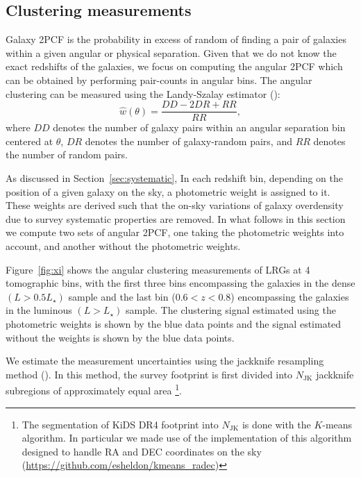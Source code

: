 \documentclass[fleqn,usenatbib,useAMS]{mnras}
\begin{document}
\subsection{Clustering measurements}\label{sec:measurement}

Galaxy 2PCF is the probability in excess of random of finding a pair of galaxies within a given angular or physical separation. Given that we do not know the exact redshifts of the galaxies, we focus on computing the angular 2PCF which can be obtained by performing pair-counts in angular bins. The angular clustering can be measured using the Landy-Szalay estimator (\citealt{landy}):
\begin{equation}
    \hat{w}(\theta) = \frac{DD-2DR+RR}{RR},
\label{eq:landy}
\end{equation}
where $DD$ denotes the number of galaxy pairs within an angular separation bin centered at $\theta$, $DR$ denotes the number of galaxy-random pairs, and $RR$ denotes the number of random pairs. 

As discussed in Section~\ref{sec:systematic}, In each redshift bin, depending on the position of a given galaxy on the sky, a photometric weight is assigned to it. These weights are derived such that the on-sky variations of galaxy overdensity due to survey systematic properties are removed. In what follows in this section we compute two sets of angular 2PCF, one taking the photometric weights into account, and another without the photometric weights. 

Figure~\ref{fig:xi} shows the angular clustering measurements of LRGs at 4 tomographic bins, with the first three bins encompassing the galaxies in the dense $(L> 0.5L_{\star})$ sample and the last bin ($0.6<z<0.8$) encompassing the galaxies in the luminous $(L> L_{\star})$ sample. The clustering signal estimated using the photometric weights is shown by the blue data points and the signal estimated without the weights is shown by the blue data points. 

We estimate the measurement uncertainties using the jackknife resampling method (\citealt{norberg2009,oliver2016,singh2017,shirasaki2017}). 
In this method, the survey footprint is first divided into $N_{\mathrm{JK}}$ jackknife subregions of approximately equal area \footnote{The segmentation of KiDS DR4 footprint into $N_{\mathrm{JK}}$ is done with the $K$-means algorithm. In particular we made use of the implementation of this algorithm designed to handle RA and DEC coordinates on the sky (\hyperlink{kmeans\_radec}{https://github.com/esheldon/kmeans\_radec})}.
\end{document}
